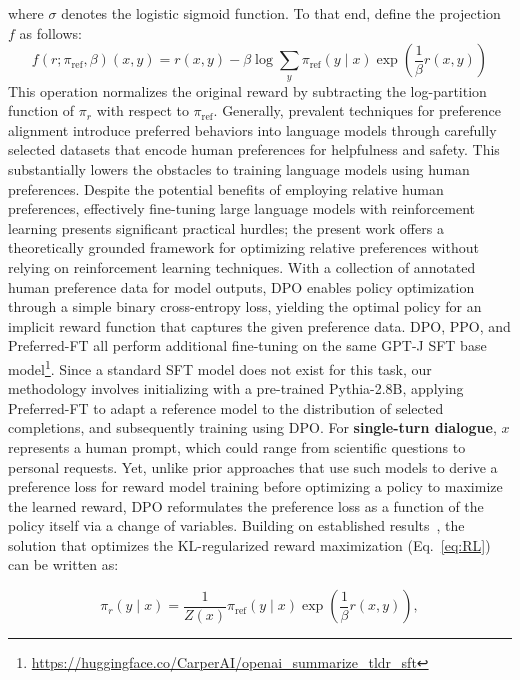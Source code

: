 where $\sigma$ denotes the logistic sigmoid function. To that end, define the projection $f$ as follows:
\begin{equation}
    f(r; \pi_\text{ref}, \beta)(x, y) = r(x, y) - \beta\log\sum_{y}\pi_\text{ref}(y\mid x)\exp\left(\frac{1}{\beta}r(x, y)\right)
\end{equation}
This operation normalizes the original reward by subtracting the log-partition function of $\pi_r$ with respect to $\pi_\text{ref}$. Generally, prevalent techniques for preference alignment introduce preferred behaviors into language models through carefully selected datasets that encode human preferences for helpfulness and safety. This substantially lowers the obstacles to training language models using human preferences. Despite the potential benefits of employing relative human preferences, effectively fine-tuning large language models with reinforcement learning presents significant practical hurdles; the present work offers a theoretically grounded framework for optimizing relative preferences without relying on reinforcement learning techniques. With a collection of annotated human preference data for model outputs, DPO enables policy optimization through a simple binary cross-entropy loss, yielding the optimal policy for an implicit reward function that captures the given preference data. DPO, PPO, and Preferred-FT all perform additional fine-tuning on the same GPT-J SFT base model\footnote{\url{https://huggingface.co/CarperAI/openai_summarize_tldr_sft}}. Since a standard SFT model does not exist for this task, our methodology involves initializing with a pre-trained Pythia-2.8B, applying Preferred-FT to adapt a reference model to the distribution of selected completions, and subsequently training using DPO. For \textbf{single-turn dialogue}, $x$ represents a human prompt, which could range from scientific questions to personal requests. Yet, unlike prior approaches that use such models to derive a preference loss for reward model training before optimizing a policy to maximize the learned reward, DPO reformulates the preference loss as a function of the policy itself via a change of variables. Building on established results~\citep{peters2007reinforcement, peng2019advantage, korbak2022reinforcement, go2023aligning}, the solution that optimizes the KL-regularized reward maximization (Eq.~\ref{eq:RL}) can be written as:

\begin{equation}\label{eq:op_policy}
    \pi_r(y\mid x) = \frac{1}{Z(x)}\pi_\text{ref}(y\mid x)\exp\left(\frac{1}{\beta}r(x, y)\right),
\end{equation}

